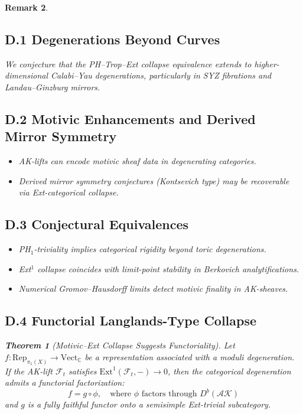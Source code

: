 \documentclass[11pt]{article}
\newtheorem{theorem}{Theorem}[section]
\newtheorem{remark}[theorem]{Remark}
\begin{document}
\begin{remark}
\subsection*{D.1 Degenerations Beyond Curves}

We conjecture that the PH–Trop–Ext collapse equivalence extends to higher-dimensional Calabi–Yau degenerations, particularly in SYZ fibrations and Landau–Ginzburg mirrors.

\subsection*{D.2 Motivic Enhancements and Derived Mirror Symmetry}

\begin{itemize}
    \item AK-lifts can encode motivic sheaf data in degenerating categories.
    \item Derived mirror symmetry conjectures (Kontsevich type) may be recoverable via Ext-categorical collapse.
\end{itemize}

\subsection*{D.3 Conjectural Equivalences}

\begin{itemize}
    \item PH$_1$-triviality implies categorical rigidity beyond toric degenerations.
    \item Ext$^1$ collapse coincides with limit-point stability in Berkovich analytifications.
    \item Numerical Gromov–Hausdorff limits detect motivic finality in AK-sheaves.
\end{itemize}

\subsection*{D.4 Functorial Langlands-Type Collapse}

\begin{theorem}[Motivic–Ext Collapse Suggests Functoriality]
Let $f : \text{Rep}_{\pi_1(X)} \to \text{Vect}_\mathbb{C}$ be a representation associated with a moduli degeneration.  
If the AK-lift $\mathcal{F}_t$ satisfies $\mathrm{Ext}^1(\mathcal{F}_t, -) \to 0$, then the categorical degeneration admits a functorial factorization:
\[
f = g \circ \phi, \quad \text{where } \phi \text{ factors through } D^b(\mathcal{AK})
\]
and $g$ is a fully faithful functor onto a semisimple Ext-trivial subcategory.
\end{theorem}


\end{remark}
\end{document}
